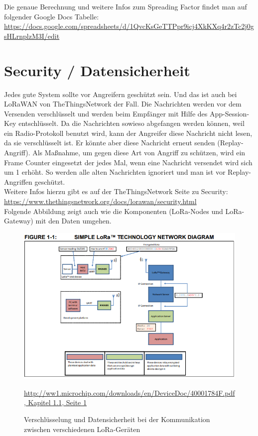 Die genaue Berechnung und weitere Infos zum Spreading Factor findet man auf folgender Google Docs Tabelle: \url{https://docs.google.com/spreadsheets/d/1QvcKsGeTTPpr9icj4XkKXq4r2zTc2j0gsHLrnplzM3I/edit}

\section{Security / Datensicherheit}
Jedes gute System sollte vor Angreifern geschützt sein. Und das ist auch bei LoRaWAN von TheThingsNetwork der Fall. Die Nachrichten werden vor dem Versenden verschlüsselt und werden beim Empfänger mit Hilfe des App-Session-Key entschlüsselt. Da die Nachrichten sowieso abgefangen werden können, weil ein Radio-Protokoll benutzt wird, kann der Angreifer diese Nachricht nicht lesen, da sie verschlüsselt ist. Er könnte aber diese Nachricht erneut senden (Replay-Angriff). Als Maßnahme, um gegen diese Art von Angriff zu schützen, wird ein Frame Counter eingesetzt der jedes Mal, wenn eine Nachricht versendet wird sich um 1 erhöht. So werden alle alten Nachrichten ignoriert und man ist vor Replay-Angriffen geschützt.\\

Weitere Infos hierzu gibt es auf der TheThingsNetwork Seite zu Security: \url{https://www.thethingsnetwork.org/docs/lorawan/security.html}\\

Folgende Abbildung zeigt auch wie die Komponenten (LoRa-Nodes und LoRa-Gateway) mit den Daten umgehen.
\begin{figure}[ht]
    \center
    \includegraphics[width=15cm]{Bilder/lora-11.png}\\
    \caption{Verschlüsselung und Datensicherheit bei der Kommunikation zwischen verschiedenen LoRa-Geräten}
    \begin{center} \quelle\url{http://ww1.microchip.com/downloads/en/DeviceDoc/40001784F.pdf, Kapitel 1.1, Seite 1} \end{center}
        \label{fig:security}
\end{figure}

